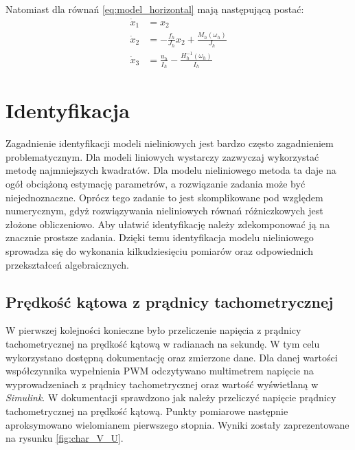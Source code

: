 \documentclass[11pt,a4paper]{article}
\begin{document}
Natomiast dla równań \eqref{eq:model_horizontal} mają następującą postać:
\begin{equation}
\begin{aligned}
\dot x_1 &= x_2\\
\dot x_2 &= -\frac{f_h}{J_h}x_2+\frac{M_h(\omega_h)}{J_h}\\
\dot x_3 &= \frac{u_h}{I_h}-\frac{H_h^{-1}(\omega_h)}{I_h}
\end{aligned}
\end{equation}

\section{Identyfikacja}
\label{sec:identyfikacja}
Zagadnienie identyfikacji modeli nieliniowych jest bardzo często zagadnieniem problematycznym. Dla modeli liniowych wystarczy zazwyczaj wykorzystać metodę najmniejszych kwadratów. Dla modelu nieliniowego metoda ta daje na ogół obciążoną estymację parametrów, a rozwiązanie zadania może być niejednoznaczne. Oprócz tego zadanie to jest skomplikowane pod względem numerycznym, gdyż rozwiązywania nieliniowych równań różniczkowych jest złożone obliczeniowo. Aby ułatwić identyfikację należy zdekomponować ją na znacznie prostsze zadania. Dzięki temu identyfikacja modelu nieliniowego sprowadza się do wykonania kilkudziesięciu pomiarów oraz odpowiednich przekształceń algebraicznych.

\subsection{Prędkość kątowa z prądnicy tachometrycznej}
W pierwszej kolejności konieczne było przeliczenie napięcia z prądnicy tachometrycznej na prędkość kątową w radianach na sekundę. W tym celu wykorzystano dostępną dokumentację oraz zmierzone dane. Dla danej wartości współczynnika wypełnienia PWM odczytywano multimetrem napięcie na wyprowadzeniach z prądnicy tachometrycznej oraz wartość wyświetlaną w \textit{Simulink}. W dokumentacji sprawdzono jak należy przeliczyć napięcie prądnicy tachometrycznej na prędkość kątową. Punkty pomiarowe następnie aproksymowano wielomianem pierwszego stopnia. Wyniki zostały zaprezentowane na rysunku \ref{fig:char_V_U}.
\end{document}
